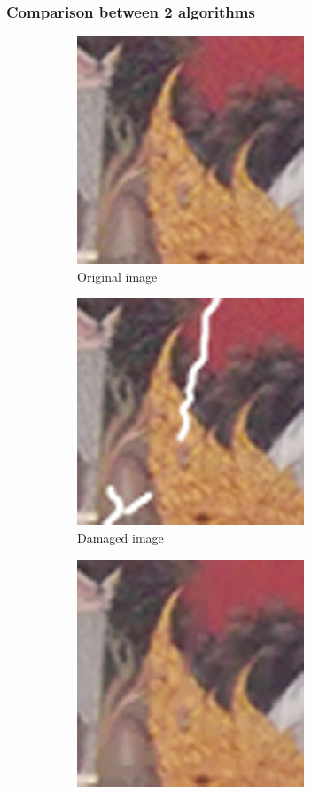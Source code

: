 \documentclass[xcolor=dvipsnames, xetex,serif]{beamer}
\begin{document}
    \begin{frame}
        \frametitle{Comparison between 2 algorithms}
        \begin{figure}[H]
            \centering
            \begin{subfigure}{0.4\linewidth}
                \centering
                \includegraphics[width=0.6\linewidth]{images/result_ex4_scaleup/original.png}
                \caption{Original image}
            \end{subfigure}
            \begin{subfigure}{0.4\linewidth}
                \centering
                \includegraphics[width=0.6\linewidth]{images/result_ex4_scaleup/toinpaint.png}
                \caption{Damaged image}
            \end{subfigure}
            \begin{subfigure}{0.4\linewidth}
                \centering
                \includegraphics[width=0.6\linewidth]{images/result_ex4_scaleup/splitbregman.png}			

\end{subfigure}
\end{figure}
\end{frame}
\end{document}
